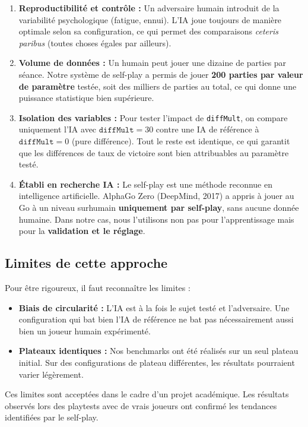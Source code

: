 \documentclass[12pt, a4paper]{article}
\begin{document}
\begin{enumerate}
    \item \textbf{Reproductibilit\'e et contr\^ole :} Un adversaire humain introduit de la variabilit\'e psychologique (fatigue, ennui). L'IA joue toujours de mani\`ere optimale selon sa configuration, ce qui permet des comparaisons \textit{ceteris paribus} (toutes choses \'egales par ailleurs).

    \item \textbf{Volume de donn\'ees :} Un humain peut jouer une dizaine de parties par s\'eance. Notre syst\`eme de self-play a permis de jouer \textbf{200 parties par valeur de param\`etre} test\'ee, soit des milliers de parties au total, ce qui donne une puissance statistique bien sup\'erieure.

    \item \textbf{Isolation des variables :} Pour tester l'impact de \texttt{diffMult}, on compare uniquement l'IA avec $\texttt{diffMult} = 30$ contre une IA de r\'ef\'erence \`a $\texttt{diffMult} = 0$ (pure diff\'erence). Tout le reste est identique, ce qui garantit que les diff\'erences de taux de victoire sont bien attribuables au param\`etre test\'e.

    \item \textbf{\'Etabli en recherche IA :} Le self-play est une m\'ethode reconnue en intelligence artificielle. AlphaGo Zero (DeepMind, 2017) a appris \`a jouer au Go \`a un niveau surhumain \textbf{uniquement par self-play}, sans aucune donn\'ee humaine. Dans notre cas, nous l'utilisons non pas pour l'apprentissage mais pour la \textbf{validation et le r\'eglage}.
\end{enumerate}

\subsection{Limites de cette approche}

Pour \^etre rigoureux, il faut reconna\^itre les limites :
\begin{itemize}
    \item \textbf{Biais de circularit\'e :} L'IA est \`a la fois le sujet test\'e et l'adversaire. Une configuration qui bat bien l'IA de r\'ef\'erence ne bat pas n\'ecessairement aussi bien un joueur humain exp\'eriment\'e.
    \item \textbf{Plateaux identiques :} Nos benchmarks ont \'et\'e r\'ealis\'es sur un seul plateau initial. Sur des configurations de plateau diff\'erentes, les r\'esultats pourraient varier l\'eg\`erement.
\end{itemize}
Ces limites sont accept\'ees dans le cadre d'un projet acad\'emique. Les r\'esultats observ\'es lors des playtests avec de vrais joueurs ont confirm\'e les tendances identifi\'ees par le self-play.
\end{document}

